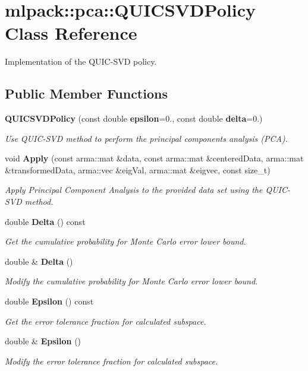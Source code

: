 \section{mlpack\+:\+:pca\+:\+:Q\+U\+I\+C\+S\+V\+D\+Policy Class Reference}
\label{classmlpack_1_1pca_1_1QUICSVDPolicy}


Implementation of the Q\+U\+I\+C-\/\+S\+VD policy.  


\subsection*{Public Member Functions}
\begin{DoxyCompactItemize}
\item 
{\bf Q\+U\+I\+C\+S\+V\+D\+Policy} (const double {\bf epsilon}=0., const double {\bf delta}=0.)
\begin{DoxyCompactList}\small\item\em Use Q\+U\+I\+C-\/\+S\+VD method to perform the principal components analysis (P\+CA). \end{DoxyCompactList}\item 
void {\bf Apply} (const arma\+::mat \&data, const arma\+::mat \&centered\+Data, arma\+::mat \&transformed\+Data, arma\+::vec \&eig\+Val, arma\+::mat \&eigvec, const size\+\_\+t)
\begin{DoxyCompactList}\small\item\em Apply Principal Component Analysis to the provided data set using the Q\+U\+I\+C-\/\+S\+VD method. \end{DoxyCompactList}\item 
double {\bf Delta} () const 
\begin{DoxyCompactList}\small\item\em Get the cumulative probability for Monte Carlo error lower bound. \end{DoxyCompactList}\item 
double \& {\bf Delta} ()
\begin{DoxyCompactList}\small\item\em Modify the cumulative probability for Monte Carlo error lower bound. \end{DoxyCompactList}\item 
double {\bf Epsilon} () const 
\begin{DoxyCompactList}\small\item\em Get the error tolerance fraction for calculated subspace. \end{DoxyCompactList}\item 
double \& {\bf Epsilon} ()
\begin{DoxyCompactList}\small\item\em Modify the error tolerance fraction for calculated subspace. \end{DoxyCompactList}\end{DoxyCompactItemize}
